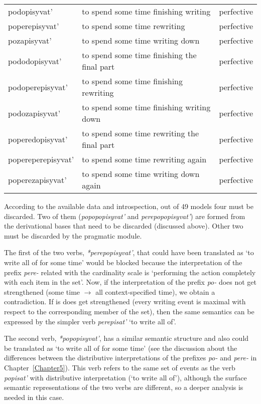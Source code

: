 \begin{longtable}{lll}
podopisyvat' & to spend some time finishing writing & perfective \\ 
poperepisyvat' & to spend some time rewriting & perfective \\ 
pozapisyvat' & to spend some time writing down & perfective \\ 
pododopisyvat' & to spend some time finishing the final part & perfective \\ 
podoperepisyvat' & to spend some time finishing rewriting & perfective \\ 
podozapisyvat' & to spend some time finishing writing down & perfective \\ 
poperedopisyvat' & to spend some time rewriting the final part & perfective \\ 
popereperepisyvat' & to spend some time rewriting again & perfective \\ 
poperezapisyvat' & to spend some time writing down again & perfective \\  
\end{longtable}

According to the available data and introspection, out of 49 models four must be discarded. Two of them (\textit{popopopisyvat'} and \textit{perepopopisyvat'}) are formed from the derivational bases that need to be discarded (discussed above). Other two must be discarded by the pragmatic module.

The first of the two verbs, \textit{*perepopisyvat'}, that could have been translated as `to write all of for some time' would be blocked because the interpretation of the prefix \textit{pere-} related with the cardinality scale is `performing the action completely with each item in the set'. Now, if the interpretation of the prefix \textit{po-} does not get strengthened (some time $\rightarrow$ all context-specified time), we obtain a contradiction.  If is does get strengthened (every writing event is maximal with respect to the corresponding member of the set), then the same semantics can be expressed by the simpler verb \textit{perepisat'} `to write all of'. 

The second verb, \textit{*popopisyvat'}, has a similar semantic structure and also could be translated as `to write all of for some time' (see the discussion about the differences between the distributive interpretations of the prefixes \textit{po-} and \textit{pere-} in Chapter~\ref{Chapter5}). This verb refers to the same set of events as the verb \textit{popisat'} with distributive interpretation (`to write all of'), although the surface semantic representations of the two verbs are different, so a deeper analysis is needed in this case.

